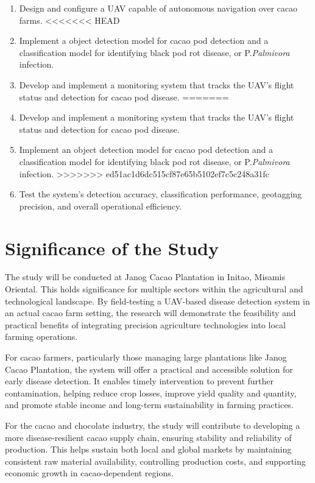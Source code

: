 {\begin{enumerate}
	\item Design and configure a UAV capable of autonomous navigation over cacao farms.
<<<<<<< HEAD
	\item Implement a object detection model for cacao pod detection and a classification model for identifying black pod rot disease, or P.\textit{Palmivora} infection.
	\item Develop and implement a monitoring system that tracks the UAV’s flight status and detection for cacao pod disease.
=======
	\item Develop and implement a monitoring system that tracks the UAV’s flight status and detection for cacao pod disease.
	\item Implement an object detection model for cacao pod detection and a classification model for identifying black pod rot disease, or P.\textit{Palmivora} infection.
>>>>>>> ed51ac1d6dc515cf87e65b5102ef7c5c248a31fc
	\item Test the system’s detection accuracy, classification performance, geotagging precision, and overall operational efficiency.
\end{enumerate}

\section{Significance of the Study}
The study will be conducted at Janog Cacao Plantation in Initao, Misamis Oriental. This holds significance for multiple sectors within the agricultural and technological landscape. By field-testing a UAV-based disease detection system in an actual cacao farm setting, the research will demonstrate the feasibility and practical benefits of integrating precision agriculture technologies into local farming operations.

For cacao farmers, particularly those managing large plantations like Janog Cacao Plantation, the system will offer a practical and accessible solution for early disease detection. It enables timely intervention to prevent further contamination, helping reduce crop losses, improve yield quality and quantity, and promote stable income and long-term sustainability in farming practices.

For the cacao and chocolate industry, the study will contribute to developing a more disease-resilient cacao supply chain, ensuring stability and reliability of production. This helps sustain both local and global markets by maintaining consistent raw material availability, controlling production costs, and supporting economic growth in cacao-dependent regions.

}
